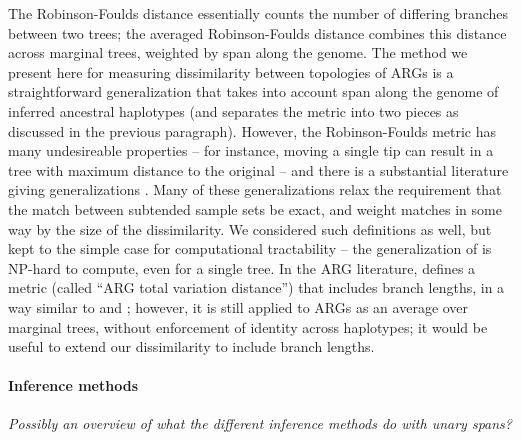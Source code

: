 \documentclass[10pt,twoside,lineno]{gsajnl}
\newcommand{\comment}[1]{{\color{violet} \it #1}}
\begin{document}
The Robinson-Foulds distance \citep{robinson1981comparison}
essentially counts the number of differing branches between two trees;
the averaged Robinson-Foulds distance \citep{kelleher2019inferring} %
combines this distance across marginal trees, weighted by span along the genome.
The method we present here for measuring dissimilarity between topologies of ARGs
is a straightforward generalization
that takes into account span along the genome of inferred ancestral haplotypes
(and separates the metric into two pieces as discussed in the previous paragraph).
However, the Robinson-Foulds metric has many undesireable properties --
for instance, moving a single tip can result in a tree with maximum distance to the original --
and there is a substantial literature giving generalizations
\citep[reviewed by][]{llabres2021generalized}.
Many of these generalizations \citep[e.g.,][]{bocker2013generalized}
relax the requirement that the match between subtended sample sets be exact,
and weight matches in some way by the size of the dissimilarity.
We considered such definitions as well, but kept to the simple case
for computational tractability --
the generalization of \citet{bocker2013generalized} is NP-hard to compute, even for a single tree.
In the ARG literature, \citet{zhang2023biobankscale}
defines a metric (called ``ARG total variation distance'') that includes branch lengths,
in a way similar to \citet{robinson1979comparison} and \citet{kuhner1994simulation};
however, it is still applied to ARGs as an average over marginal trees,
without enforcement of identity across haplotypes;
it would be useful to extend our dissimilarity to include branch lengths.

\paragraph{Inference methods}
\comment{Possibly an overview of what the different inference methods do with unary spans?}



\appendix

\end{document}
